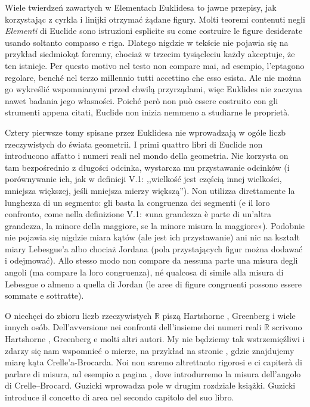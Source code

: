 Wiele twierdzeń zawartych w Elementach Euklidesa to jawne przepisy, jak korzystając z cyrkla i linijki otrzymać żądane figury. %
Molti teoremi contenuti negli \emph{Elementi} di Euclide sono istruzioni esplicite su come costruire le figure desiderate usando soltanto compasso e riga. %
Dlatego nigdzie w tekście nie pojawia się na przykład siedmiokąt foremny, chociaż w trzecim tysiącleciu każdy akceptuje, że ten istnieje. %
Per questo motivo nel testo non compare mai, ad esempio, l'eptagono regolare, benché nel terzo millennio tutti accettino che esso esista. %
Ale nie można go wykreślić wspomnianymi przed chwilą przyrządami, więc Euklides nie zaczyna nawet badania jego własności. %
Poiché però non può essere costruito con gli strumenti appena citati, Euclide non inizia nemmeno a studiarne le proprietà. %

Cztery pierwsze tomy spisane przez Euklidesa nie wprowadzają w ogóle liczb rzeczywistych do świata geometrii. %
I primi quattro libri di Euclide non introducono affatto i numeri reali nel mondo della geometria. %
Nie korzysta on tam bezpośrednio z długości odcinka, wystarcza mu przystawanie odcinków (i porównywanie ich, jak w definicji V.1: ,,wielkość jest częścią innej wielkości, mniejsza większej, jeśli mniejsza mierzy większą''). %
Non utilizza direttamente la lunghezza di un segmento: gli basta la congruenza dei segmenti (e il loro confronto, come nella definizione V.1: «una grandezza è parte di un'altra grandezza, la minore della maggiore, se la minore misura la maggiore»). %
Podobnie nie pojawia się nigdzie miara kątów (ale jest ich przystawanie) ani nic na kształt miary Lebesgue'a albo chociaż Jordana (pola przystających figur można dodawać i odejmować). %
Allo stesso modo non compare da nessuna parte una misura degli angoli (ma compare la loro congruenza), né qualcosa di simile alla misura di Lebesgue o almeno a quella di Jordan (le aree di figure congruenti possono essere sommate e sottratte). %

O niechęci do zbioru liczb rzeczywistych $\mathbb R$ piszą Hartshorne \cite[s. 165-168]{hartshorne_2000}, Greenberg \cite[s. 198]{greenberg_2010} i wiele innych osób. %
Dell'avversione nei confronti dell'insieme dei numeri reali $\mathbb R$ scrivono Hartshorne \cite[p. 165--168]{hartshorne_2000}, Greenberg \cite[p. 198]{greenberg_2010} e molti altri autori. %
My nie będziemy tak wstrzemięźliwi i zdarzy się nam wspomnieć o mierze, na przykład na stronie \pageref{miara_kata_crellea_brocarda}, gdzie znajdujemy miarę kąta Crelle'a-Brocarda. %
Noi non saremo altrettanto rigorosi e ci capiterà di parlare di misura, ad esempio a pagina \pageref{miara_kata_crellea_brocarda}, dove introdurremo la misura dell'angolo di Crelle--Brocard. %
Guzicki \cite[s. ???]{guzicki_2021} wprowadza pole w drugim rozdziale książki. %
Guzicki \cite[p. ???]{guzicki_2021} introduce il concetto di area nel secondo capitolo del suo libro. %






%